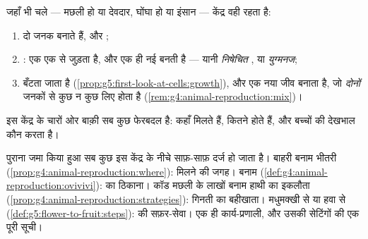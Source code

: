 \begin{proposition}[न बदलने वाला केंद्र]\label{prop:g8:sexual-reproduction:core}
 जहाँ भी चले --- मछली हो या देवदार, घोंघा हो या इंसान ---
केंद्र वही रहता है:
\begin{enumerate}
  \item दो जनक  बनाते हैं,  और ;
  \item \emph{}: एक   एक   से जुड़ता है, और
        एक ही नई  बनती है --- यानी \emph{निषेचित }, या
        \emph{युग्मनज};
  \item {} बँटता जाता है
        (\cref{prop:g5:first-look-at-cells:growth}), और एक नया जीव
        बनाता है, जो \emph{दोनों} जनकों से कुछ न कुछ लिए होता है
        (\cref{rem:g4:animal-reproduction:mix})।
\end{enumerate}
इस केंद्र के चारों ओर बाक़ी सब कुछ फेरबदल है:  कहाँ मिलते हैं,
कितने होते हैं, और बच्चों की देखभाल कौन करता है।
\end{proposition}
\admitted

\begin{example}\label{ex:g8:sexual-reproduction:variations}
पुराना जमा किया हुआ सब कुछ इस केंद्र के नीचे साफ़-साफ़ दर्ज हो जाता है।
बाहरी बनाम भीतरी 
(\cref{prop:g4:animal-reproduction:where}): मिलने की जगह।  बनाम
 (\cref{def:g4:animal-reproduction:ovivivi}):  का ठिकाना।
कॉड मछली के लाखों बनाम हाथी का इकलौता
(\cref{prop:g4:animal-reproduction:strategies}): गिनती का बहीखाता।
मधुमक्खी से या हवा से 
(\cref{def:g5:flower-to-fruit:steps}):   की सफ़र-सेवा। एक ही
कार्य-प्रणाली, और उसकी सेटिंगों की एक पूरी सूची।
\end{example}

